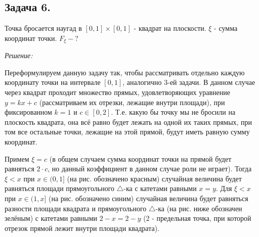 \subsection*{Задача 6.}

Точка бросается наугад в $[0,1] \times [0,1]$ - квадрат на плоскости. $\xi$ - сумма координат точки. $F_{\xi} - ?$

\noindent \textit{Решение:}

Переформулируем данную задачу так, чтобы рассматривать отдельно каждую координату точки на интервале $[0,1]$, аналогично 3-ей задачи. В данном случае через квадрат проходит множество прямых, удовлетворяющих уравнение $y=kx+c$ (рассматриваем их отрезки, лежащие внутри площади), при фиксированном $k=1$ и $c \in [0,2]$. Т.е. какую бы точку мы не бросили на плоскость квадрата, она всё равно будет лежать на одной их таких прямых, при том все остальные точки, лежащие на этой прямой, будут иметь равную сумму координат.
\begin{figure}[H]
\end{figure}
Примем $\xi = c$ (в общем случаем сумма координат точки на прямой будет равняться $2 \cdot c$, но данный коэффициент в данном случае роли не играет). Тогда $\xi < x$ при $x \in (0,1]$ (на рис. обозначено красным) случайная величина будет равняться площади прямоугольного $\triangle$-ка с катетами равными $x = y$. Для $\xi < x$ при $x \in (1,x]$ (на рис. обозначено синим) случайная величина будет равняться разности площади квадрата и прямоугольного $\triangle$-ка (на рис. ниже обозначен зелёным) с катетами равными $2-x = 2-y$ (2 - предельная точка, при которой отрезок прямой лежит внутри площади квадрата).
